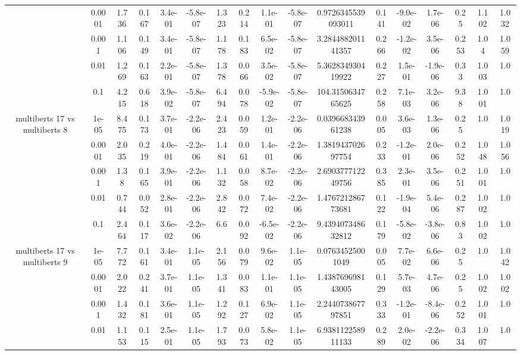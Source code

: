 \begin{tabular}{|c|c|c|c|c|c|c|c|c|c|c|c|c|c|c|c|c|}
 & 0.0001 & 1.736 & 0.167 & 3.4e-01 & -5.8e-07 & 1.323 & 0.214 & 1.1e-01 & -5.8e-07 & 0.9726345539093011 & 0.141 & -9.0e-02 & 1.7e-06 & 0.25 & 1.102 & 1.032 \\
 & 0.001 & 1.106 & 0.149 & 3.4e-01 & -5.8e-07 & 1.178 & 0.183 & 6.5e-02 & -5.8e-07 & 3.284488201141357 & 0.266 & -1.2e-02 & 3.5e-06 & 0.253 & 1.04 & 1.059 \\
 & 0.01 & 1.269 & 0.163 & 2.2e-01 & -5.8e-07 & 1.378 & 0.066 & 3.5e-02 & -5.8e-07 & 5.362834930419922 & 0.227 & 1.5e-01 & -1.9e-06 & 0.33 & 1.003 & 1.0 \\
 & 0.1 & 4.215 & 0.618 & 3.9e-02 & -5.8e-07 & 6.494 & 0.078 & -5.9e-02 & -5.8e-07 & 104.3150634765625 & 0.258 & 7.1e-03 & 3.2e-06 & 9.38 & 1.001 & 1.0 \\
\hline
\multirow{5}{*}{multiberts 17 vs multiberts 8} & 1e-05 & 8.475 & 0.173 & 3.7e-01 & -2.2e-06 & 2.423 & 0.059 & 1.2e-01 & -2.2e-06 & 0.039668343961238 & 0.005 & 3.6e-03 & 1.3e-06 & 0.25 & 1.0 & 1.019 \\
 & 0.0001 & 2.035 & 0.219 & 4.0e-01 & -2.2e-06 & 1.484 & 0.061 & 1.4e-01 & -2.2e-06 & 1.381943702697754 & 0.233 & -1.2e-01 & 2.0e-06 & 0.252 & 1.048 & 1.056 \\
 & 0.001 & 1.38 & 0.165 & 3.9e-01 & -2.2e-06 & 1.132 & 0.058 & 8.7e-02 & -2.2e-06 & 2.690377712249756 & 0.385 & 2.3e-01 & 3.5e-06 & 0.251 & 1.001 & 1.0 \\
 & 0.01 & 0.744 & 0.052 & 2.8e-01 & -2.2e-06 & 2.842 & 0.072 & 7.4e-02 & -2.2e-06 & 1.476721286773681 & 0.122 & -1.9e-04 & 5.4e-06 & 0.287 & 1.002 & 1.0 \\
 & 0.1 & 2.464 & 0.117 & 3.6e-02 & -2.2e-06 & 6.6 & 0.092 & -6.5e-02 & -2.2e-06 & 9.439407348632812 & 0.179 & -5.8e-02 & -3.8e-06 & 0.83 & 1.002 & 1.0 \\
\hline
\multirow{5}{*}{multiberts 17 vs multiberts 9} & 1e-05 & 7.772 & 0.161 & 3.4e-01 & 1.1e-05 & 2.156 & 0.079 & 9.6e-02 & 1.1e-05 & 0.07634525001049 & 0.005 & 7.7e-02 & 6.6e-06 & 0.25 & 1.0 & 1.042 \\
 & 0.0001 & 2.022 & 0.241 & 3.7e-01 & 1.1e-05 & 1.341 & 0.083 & 1.1e-01 & 1.1e-05 & 1.438769698143005 & 0.129 & 5.7e-03 & 4.7e-06 & 0.25 & 1.002 & 1.002 \\
 & 0.001 & 1.432 & 0.181 & 3.6e-01 & 1.1e-05 & 1.292 & 0.127 & 6.9e-02 & 1.1e-05 & 2.244073867797851 & 0.333 & -1.2e-01 & -8.4e-06 & 0.252 & 1.001 & 1.0 \\
 & 0.01 & 1.153 & 0.115 & 2.5e-01 & 1.1e-05 & 1.793 & 0.073 & 5.8e-02 & 1.1e-05 & 6.938112258911133 & 0.289 & 2.0e-02 & -2.2e-06 & 0.334 & 1.007 & 1.0 \\

\end{tabular}
